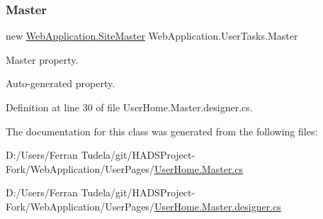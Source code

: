 \subsubsection{\texorpdfstring{Master}{Master}}
{\footnotesize\ttfamily new \mbox{\hyperlink{classWebApplication_1_1SiteMaster}{Web\+Application.\+Site\+Master}} Web\+Application.\+User\+Tasks.\+Master\hspace{0.3cm}{\ttfamily [get]}}



Master property. 

Auto-\/generated property. 

Definition at line 30 of file User\+Home.\+Master.\+designer.\+cs.



The documentation for this class was generated from the following files\+:\begin{DoxyCompactItemize}
\item 
D\+:/\+Users/\+Ferran Tudela/git/\+H\+A\+D\+S\+Project-\/\+Fork/\+Web\+Application/\+User\+Pages/\mbox{\hyperlink{UserHome_8Master_8cs}{User\+Home.\+Master.\+cs}}\item 
D\+:/\+Users/\+Ferran Tudela/git/\+H\+A\+D\+S\+Project-\/\+Fork/\+Web\+Application/\+User\+Pages/\mbox{\hyperlink{UserHome_8Master_8designer_8cs}{User\+Home.\+Master.\+designer.\+cs}}\end{DoxyCompactItemize}
